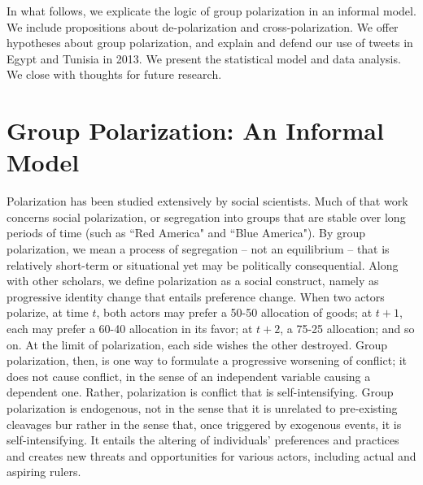 \documentclass[12pt]{article}
\begin{document}
In what follows, we explicate the logic of group polarization in an informal model.  We include propositions about de-polarization and cross-polarization.  We offer hypotheses about group polarization, and explain and defend our use of tweets in Egypt and Tunisia in 2013.  We present the statistical model and data analysis.  We close with thoughts for future research.


\section*{Group Polarization: An Informal Model}
Polarization has been studied extensively by social scientists.  Much of that work concerns social polarization, or segregation into groups that are stable over long periods of time (such as ``Red America" and ``Blue America").   By group polarization, we mean a process of segregation – not an equilibrium – that is relatively short-term or situational yet may be politically consequential.   Along with other scholars, we define polarization as a social construct, namely as progressive identity change that entails preference change.   When two actors polarize, at time $t$, both actors may prefer a 50-50 allocation of goods; at $t+1$, each may prefer a 60-40 allocation in its favor; at $t+2$, a 75-25 allocation; and so on.  At the limit of polarization, each side wishes the other destroyed.   Group polarization, then, is one way to formulate a progressive worsening of conflict; it does not cause conflict, in the sense of an independent variable causing a dependent one.  Rather, polarization is conflict that is self-intensifying.  Group polarization is endogenous, not in the sense that it is unrelated to pre-existing cleavages bur rather in the sense that, once triggered by exogenous events, it is self-intensifying.   It entails the altering of individuals' preferences and practices and creates new threats and opportunities for various actors, including actual and aspiring rulers.  
\end{document}
